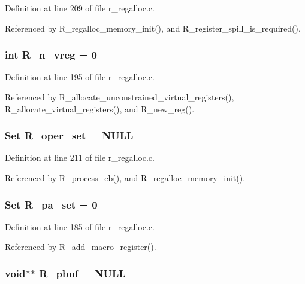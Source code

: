 Definition at line 209 of file r\_\-regalloc.c.

Referenced by R\_\-regalloc\_\-memory\_\-init(), and R\_\-register\_\-spill\_\-is\_\-required().
\subsubsection{\setlength{\rightskip}{0pt plus 5cm}int \bf{R\_\-n\_\-vreg} = 0}\label{r__regalloc_8c_41daa2e5832a1c0f156913701d1d8824}




Definition at line 195 of file r\_\-regalloc.c.

Referenced by R\_\-allocate\_\-unconstrained\_\-virtual\_\-registers(), R\_\-allocate\_\-virtual\_\-registers(), and R\_\-new\_\-reg().
\subsubsection{\setlength{\rightskip}{0pt plus 5cm}\bf{Set} \bf{R\_\-oper\_\-set} = \bf{NULL}}\label{r__regalloc_8c_0462961e38d1e52b29b2c1abd94565a6}




Definition at line 211 of file r\_\-regalloc.c.

Referenced by R\_\-process\_\-cb(), and R\_\-regalloc\_\-memory\_\-init().
\subsubsection{\setlength{\rightskip}{0pt plus 5cm}\bf{Set} \bf{R\_\-pa\_\-set} = 0}\label{r__regalloc_8c_681026df447bda173c8d26bd472058ba}




Definition at line 185 of file r\_\-regalloc.c.

Referenced by R\_\-add\_\-macro\_\-register().
\subsubsection{\setlength{\rightskip}{0pt plus 5cm}void$\ast$$\ast$ \bf{R\_\-pbuf} = \bf{NULL}}\label{r__regalloc_8c_c477d4746f6efc32a6a33c4dd4697bb7}




